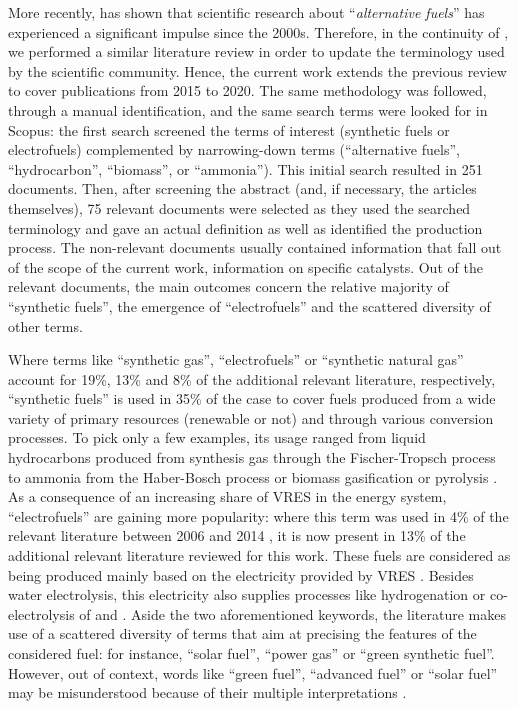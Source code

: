 More recently, \citet{Stancin2020} has shown that scientific research about ``\textit{alternative fuels}'' has experienced a significant impulse since the 2000s. Therefore, in the continuity of \cite{ridjan2016}, we performed a similar literature review in order to update the terminology used by the scientific community. Hence, the current work extends the previous review to cover publications from 2015 to 2020. The same methodology was followed, through a manual identification, and the same search terms were looked for in Scopus: the first search screened the terms of interest (\ie synthetic fuels or electrofuels) complemented by narrowing-down terms (\eg “alternative fuels”, “hydrocarbon”, “biomass”, or “ammonia”). This initial search resulted in 251 documents. Then, after screening the abstract (and, if necessary, the articles themselves), 75 relevant documents were selected as they used the searched terminology and gave an actual definition as well as identified the production process. The non-relevant documents usually contained information that fall out of the scope of the current work, \eg information on specific catalysts. Out of the relevant documents, the main outcomes concern the relative majority of ``synthetic fuels'', the emergence of ``electrofuels'' and the scattered diversity of other terms. 

Where terms like ``synthetic gas'', ``electrofuels'' or ``synthetic natural gas'' account for 19\%, 13\% and 8\% of the additional relevant literature, respectively, ``synthetic fuels'' is used in 35\% of the case to cover fuels produced from a wide variety of primary resources (renewable or not) and through various conversion processes. To pick only a few examples, its usage ranged from liquid hydrocarbons produced from synthesis gas through the Fischer-Tropsch process \cite{haarlemmer2014,Trieb2018} to ammonia from the Haber-Bosch process \cite{bargiacchi2019} or biomass gasification or pyrolysis \cite{monaco2018, rao2015}. As a consequence of an increasing share of \gls{VRES} in the energy system, ``electrofuels'' are gaining more popularity: where this term was used in 4\% of the relevant literature between 2006 and 2014 \cite{ridjan2016}, it is now present in 13\% of the additional relevant literature reviewed for this work. These fuels are considered as being produced mainly based on the electricity provided by \gls{VRES} \cite{brynolf2018}. Besides water electrolysis, this electricity also supplies processes like  hydrogenation \cite{brynolf2018,Decker2019,Pearson2012} or co-electrolysis of  and  \cite{hanggi2019,larsson2015}. Aside the two aforementioned keywords, the literature makes use of a scattered diversity of terms that aim at precising the features of the considered fuel: for instance, ``solar fuel'', ``power gas'' or ``green synthetic fuel''. However, out of context, words like ``green fuel'', ``advanced fuel'' or ``solar fuel'' may be misunderstood because of their multiple interpretations \cite{ridjan2016}.

